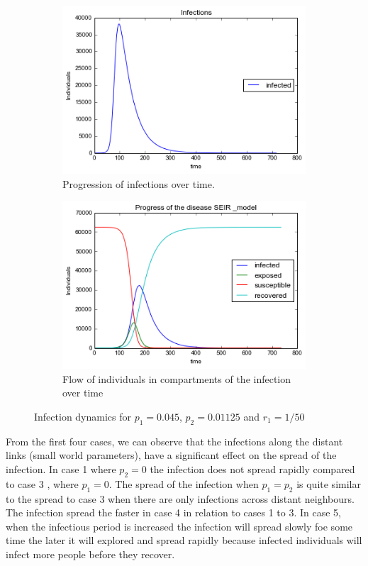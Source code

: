 \begin{figure}[h!]
    \centering
    \begin{subfigure}[b]{0.45\textwidth}
        \includegraphics[width=\textwidth]{images/5infections}
        \caption{Progression of infections over time. }
        \label{a51}
    \end{subfigure}
     \begin{subfigure}[b]{0.45\textwidth}
        \includegraphics[width=\textwidth]{images/5SEIR}
        \caption{  Flow of individuals in compartments of the infection over time}
        \label{a52}
    \end{subfigure}
  \caption{Infection dynamics for $p_1 = 0.045 $, $p_2=0.01125$ and $r_1 = 1/50$ }
 \end{figure}

 From the first four cases, we can observe that the infections along the distant links  (small world parameters), have a significant effect on the spread of the infection. In case 1 where $p_2 =0$ the infection does not spread rapidly compared to case 3 , where $p_1 =0$. The spread of the infection when $p_1 =p_2$ is quite similar to the spread to case 3 when there are only infections across distant neighbours. The infection spread the faster in case 4 in relation to cases 1 to 3. 
 In case 5, when the infectious period is increased the infection will spread slowly foe some time the later it will explored and spread rapidly because infected individuals will infect more people before they recover.

